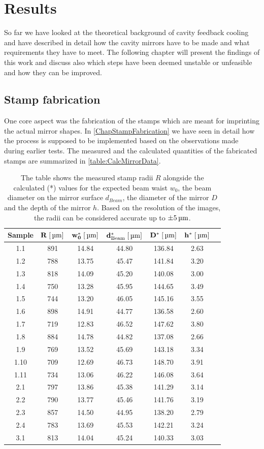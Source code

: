 \chapter{Results}
So far we have looked at the theoretical background of cavity feedback cooling and have described in detail how the cavity mirrors have to be made and what requirements they have to meet. The following chapter will present the findings of this work and discuss also which steps have been deemed unstable or unfeasible and how they can be improved.

\section{Stamp fabrication}
One core aspect was the fabrication of the stamps which are meant for imprinting the actual mirror shapes. In \autoref{ChapStampFabrication} we have seen in detail how the process is supposed to be implemented based on the observations made during earlier tests. The measured and the calculated quantities of the fabricated stamps are summarized in \autoref{table:CalcMirrorData}.
\begin{table}[H]
	\begin{tabular}{ccccccc}
	\hline
\textbf{Sample} & \textbf{$\mathbf{R\;[\um]}$} & \textbf{$\mathbf{w_0^*\;[\um]}$} & \textbf{$\mathbf{d_{\si{Beam}}^*\;[\um]}$} & \textbf{$\mathbf{D^*\;[\um]}$} & \textbf{$\mathbf{h^*\;[\um]}$} \\
	\hline
	1.1 & 891 & 14.84 & 44.80 & 136.84 & 2.63 \\
	1.2 & 788 & 13.75 & 45.47 & 141.84 & 3.20 \\
	1.3 & 818 & 14.09 & 45.20 & 140.08 & 3.00 \\
	1.4 & 750 & 13.28 & 45.95 & 144.65 & 3.49 \\
	1.5 & 744 & 13.20 & 46.05 & 145.16 & 3.55 \\
	1.6 & 898 & 14.91 & 44.77 & 136.58 & 2.60 \\
	1.7 & 719 & 12.83 & 46.52 & 147.62 & 3.80 \\
	1.8 & 884 & 14.78 & 44.82 & 137.08 & 2.66 \\
	1.9 & 769 & 13.52 & 45.69 & 143.18 & 3.34 \\
	1.10 & 709 & 12.69 & 46.73 & 148.70 & 3.91 \\
	1.11 & 734 & 13.06 & 46.22 & 146.08 & 3.64 \\
	2.1 & 797 & 13.86 & 45.38 & 141.29 & 3.14 \\
	2.2 & 790 & 13.77 & 45.46 & 141.76 & 3.19 \\
	2.3 & 857 & 14.50 & 44.95 & 138.20 & 2.79 \\
	2.4 & 783 & 13.69 & 45.53 & 142.21 & 3.24 \\
	3.1 & 813 & 14.04 & 45.24 & 140.33 & 3.03 \\
	\hline
\end{tabular}
	\caption{The table shows the measured stamp radii $R$ alongside the calculated (*) values for the expected beam waist $w_0$, the beam diameter on the mirror surface $d_{\si{Beam}}$, the diameter of the mirror $D$ and the depth of the mirror $h$. Based on the resolution of the images, the radii can be considered accurate up to $\pm 5\um$.}
	\label{table:CalcMirrorData}
\end{table}
